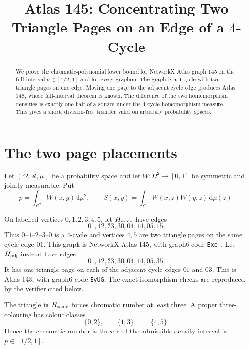 \documentclass[11pt]{article}
\title{Atlas 145: Concentrating Two Triangle Pages on an Edge of a $4$-Cycle}
\author{}
\date{}
\newcommand{\dd}{\,\mathrm d}
\begin{document}
\maketitle

\begin{abstract}
We prove the chromatic-polynomial lower bound for NetworkX Atlas graph 145
on the full interval $p\in[1/2,1]$ and for every graphon.  The graph is a
$4$-cycle with two triangle pages on one edge.  Moving one page to the
adjacent cycle edge produces Atlas 148, whose full-interval theorem is known.
The difference of the two homomorphism densities is exactly one half of a
square under the $4$-cycle homomorphism measure.  This gives a short,
division-free transfer valid on arbitrary probability spaces.
\end{abstract}


\section{The two page placements}

Let $(\Omega,\mathcal A,\mu)$ be a probability space and let
$W\colon\Omega^2\to[0,1]$ be symmetric and jointly measurable.  Put
\[
 p=\int_{\Omega^2}W(x,y)\dd\mu^2,
 \qquad
 S(x,y)=\int_\Omega W(x,z)W(y,z)\dd\mu(z).
\]

On labelled vertices $0,1,2,3,4,5$, let $H_{\rm same}$ have edges
\begin{equation}
 01,12,23,30,04,14,05,15.
 \label{eq:same-edges}
\end{equation}
Thus $0$--$1$--$2$--$3$--$0$ is a $4$-cycle and vertices $4,5$ are two triangle pages on
the same cycle edge $01$.  This graph is NetworkX Atlas 145, with graph6
code \texttt{Exe\_}.  Let $H_{\rm adj}$ instead have edges
\begin{equation}
 01,12,23,30,04,14,05,35.
 \label{eq:adjacent-edges}
\end{equation}
It has one triangle page on each of the adjacent cycle edges $01$ and $03$.
This is Atlas 148, with graph6 code \texttt{EyUG}.  The exact isomorphism
checks are reproduced by the verifier cited below.

The triangle in $H_{\rm same}$ forces chromatic number at least three.  A
proper three-colouring has colour classes
\[
 \{0,2\},\qquad \{1,3\},\qquad \{4,5\}.
\]
Hence the chromatic number is three and the admissible density interval is
$p\in[1/2,1]$.
\end{document}
